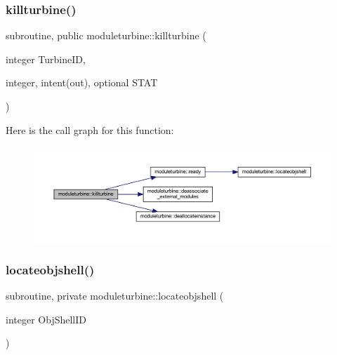 \subsubsection{\texorpdfstring{killturbine()}{killturbine()}}
{\footnotesize\ttfamily subroutine, public moduleturbine\+::killturbine (\begin{DoxyParamCaption}\item[{integer}]{Turbine\+ID,  }\item[{integer, intent(out), optional}]{S\+T\+AT }\end{DoxyParamCaption})}

Here is the call graph for this function\+:\nopagebreak
\begin{figure}[H]
\begin{center}
\leavevmode
\includegraphics[width=350pt]{namespacemoduleturbine_a14dcb5e2f0dfed8ce2da9616f01b2a58_cgraph}
\end{center}
\end{figure}
\mbox{\label{namespacemoduleturbine_ad69845ea1216f04acc515267e6a71770}} 
\subsubsection{\texorpdfstring{locateobjshell()}{locateobjshell()}}
{\footnotesize\ttfamily subroutine, private moduleturbine\+::locateobjshell (\begin{DoxyParamCaption}\item[{integer}]{Obj\+Shell\+ID }\end{DoxyParamCaption})\hspace{0.3cm}{\ttfamily [private]}}

